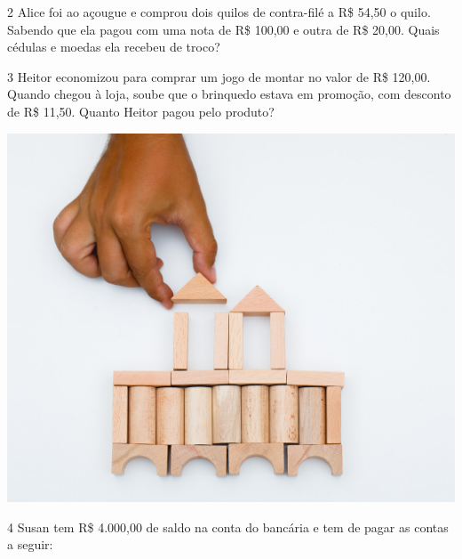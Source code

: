 \num{2} Alice foi ao açougue e comprou dois quilos de contra-filé
a R\$ 54,50 o quilo. Sabendo que ela pagou com uma nota de R\$ 100,00 
e outra de R\$ 20,00. Quais cédulas e moedas ela recebeu de troco?


\num{3} Heitor economizou para comprar um jogo de montar no valor de R\$ 120,00.
Quando chegou à loja, soube que o brinquedo estava em promoção, com desconto de R\$ 11,50. Quanto Heitor pagou pelo produto?

\begin{center}
\includegraphics[width=.5\textwidth]{media/image37a.jpg}
\end{center}

\num{4} Susan tem R\$ 4.000,00 de saldo na conta do bancária e tem de pagar as contas a seguir: 

